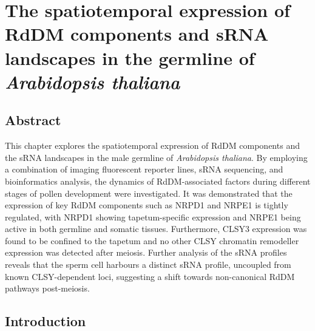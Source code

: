 
\chapter{The spatiotemporal expression of RdDM components and sRNA landscapes in the germline of \textit{Arabidopsis thaliana}}

\ifpdf
    \graphicspath{{Chapter2/Figs/Raster/}{Chapter2/Figs/PDF/}{Chapter2/Figs/}}
\else
    \graphicspath{{Chapter2/Figs/Vector/}{Chapter2/Figs/}}
\fi

\section{Abstract}

This chapter explores the spatiotemporal expression of RdDM components and the sRNA landscapes in the male germline of \textit{Arabidopsis thaliana}. By employing a combination of imaging fluorescent reporter lines, sRNA sequencing, and bioinformatics analysis, the dynamics of RdDM-associated factors during different stages of pollen development were investigated. It was demonstrated that the expression of key RdDM components such as NRPD1 and NRPE1 is tightly regulated, with NRPD1 showing tapetum-specific expression and NRPE1 being active in both germline and somatic tissues. Furthermore, CLSY3 expression was found to be confined to the tapetum and no other CLSY chromatin remodeller expression was detected after meiosis. Further analysis of the sRNA profiles reveals that the sperm cell harbours a distinct sRNA profile, uncoupled from known CLSY-dependent loci, suggesting a shift towards non-canonical RdDM pathways post-meiosis. 

\section{Introduction}

